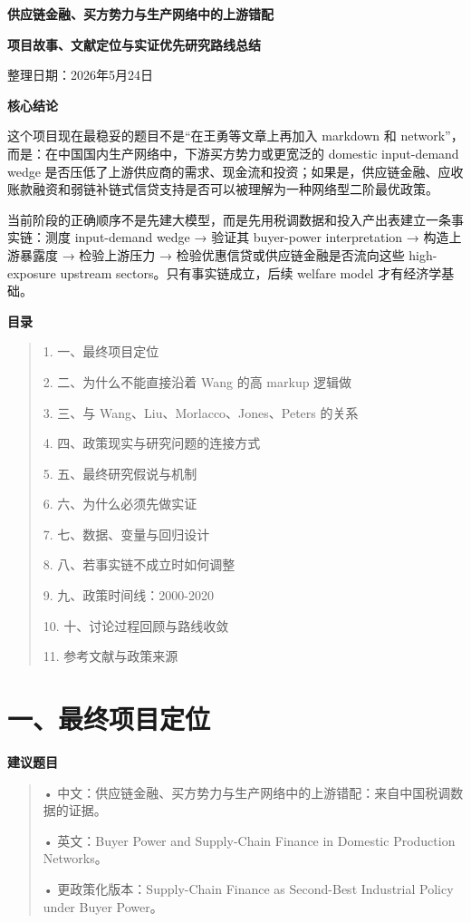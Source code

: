 \documentclass[
  12pt,
]{ctexart}
\author{}
\date{}
\begin{document}
\textbf{供应链金融、买方势力与生产网络中的上游错配}

\textbf{项目故事、文献定位与实证优先研究路线总结}

整理日期：2026年5月24日

\textbf{核心结论}

这个项目现在最稳妥的题目不是``在王勇等文章上再加入 markdown 和 network''，而是：在中国国内生产网络中，下游买方势力或更宽泛的 domestic input-demand wedge 是否压低了上游供应商的需求、现金流和投资；如果是，供应链金融、应收账款融资和弱链补链式信贷支持是否可以被理解为一种网络型二阶最优政策。

当前阶段的正确顺序不是先建大模型，而是先用税调数据和投入产出表建立一条事实链：测度 input-demand wedge → 验证其 buyer-power interpretation → 构造上游暴露度 → 检验上游压力 → 检验优惠信贷或供应链金融是否流向这些 high-exposure upstream sectors。只有事实链成立，后续 welfare model 才有经济学基础。

\textbf{目录}

\begin{quote}
1. 一、最终项目定位

2. 二、为什么不能直接沿着 Wang 的高 markup 逻辑做

3. 三、与 Wang、Liu、Morlacco、Jones、Peters 的关系

4. 四、政策现实与研究问题的连接方式

5. 五、最终研究假说与机制

6. 六、为什么必须先做实证

7. 七、数据、变量与回归设计

8. 八、若事实链不成立时如何调整

9. 九、政策时间线：2000-2020

10. 十、讨论过程回顾与路线收敛

11. 参考文献与政策来源
\end{quote}

\section{一、最终项目定位}\label{ux4e00ux6700ux7ec8ux9879ux76eeux5b9aux4f4d}

\textbf{建议题目}

\begin{quote}
• 中文：供应链金融、买方势力与生产网络中的上游错配：来自中国税调数据的证据。

• 英文：Buyer Power and Supply-Chain Finance in Domestic Production Networks。

• 更政策化版本：Supply-Chain Finance as Second-Best Industrial Policy under Buyer Power。
\end{quote}
\end{document}
